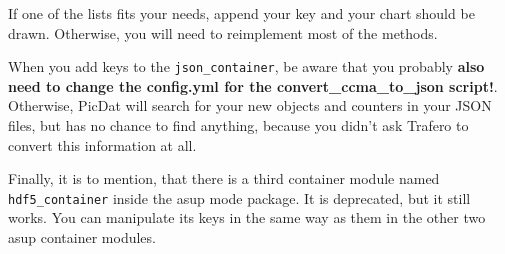 \documentclass[a4paper,11pt]{article}
\begin{document}
If one of the lists fits your needs, append your key and your chart should be drawn. Otherwise, you will need to reimplement most of the methods. 
\bigskip

When you add keys to the \verb|json_container|, be aware that you probably \textbf{also need to change the config.yml for the convert\_ccma\_to\_json script!}. Otherwise, PicDat will search for your new objects and counters in your JSON files, but has no chance to find anything, because you didn't ask Trafero to convert this information at all.
\bigskip

Finally, it is to mention, that there is a third container module named \verb|hdf5_container| inside the asup mode package. It is deprecated, but it still works. You can manipulate its keys in the same way as them in the other two asup container modules.
\end{document}
